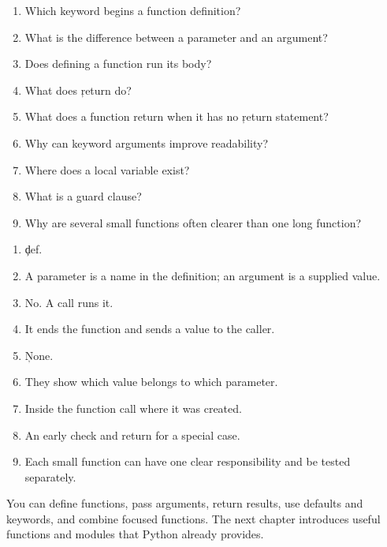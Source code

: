 
\begin{enumerate}
    \item Which keyword begins a function definition?
    \item What is the difference between a parameter and an argument?
    \item Does defining a function run its body?
    \item What does \c{return} do?
    \item What does a function return when it has no \c{return} statement?
    \item Why can keyword arguments improve readability?
    \item Where does a local variable exist?
    \item What is a guard clause?
    \item Why are several small functions often clearer than one long function?
\end{enumerate}


\begin{enumerate}
    \item \c{def}.
    \item A parameter is a name in the definition; an argument is a supplied value.
    \item No. A call runs it.
    \item It ends the function and sends a value to the caller.
    \item \c{None}.
    \item They show which value belongs to which parameter.
    \item Inside the function call where it was created.
    \item An early check and return for a special case.
    \item Each small function can have one clear responsibility and be tested separately.
\end{enumerate}

\begin{tcolorbox}[title=Chapter summary,colframe=orange,colback=white,arc=2mm]
You can define functions, pass arguments, return results, use defaults and
keywords, and combine focused functions. The next chapter introduces useful
functions and modules that Python already provides.
\end{tcolorbox}

